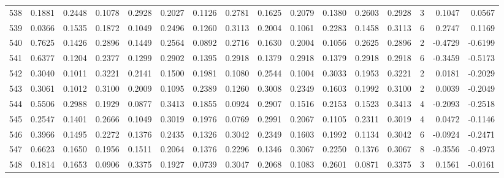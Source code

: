 \begin{tabular}{lrrrrrrrrrrrrrrr}
538 &      0.1881 &  0.2448 &  0.1078 &  0.2928 &  0.2027 &  0.1126 &  0.2781 &  0.1625 &  0.2079 &  0.1380 &   0.2603 &     0.2928 &      3 &                    0.1047 &                     0.0567 \\
539 &      0.0366 &  0.1535 &  0.1872 &  0.1049 &  0.2496 &  0.1260 &  0.3113 &  0.2004 &  0.1061 &  0.2283 &   0.1458 &     0.3113 &      6 &                    0.2747 &                     0.1169 \\
540 &      0.7625 &  0.1426 &  0.2896 &  0.1449 &  0.2564 &  0.0892 &  0.2716 &  0.1630 &  0.2004 &  0.1056 &   0.2625 &     0.2896 &      2 &                   -0.4729 &                    -0.6199 \\
541 &      0.6377 &  0.1204 &  0.2377 &  0.1299 &  0.2902 &  0.1395 &  0.2918 &  0.1379 &  0.2918 &  0.1379 &   0.2918 &     0.2918 &      6 &                   -0.3459 &                    -0.5173 \\
542 &      0.3040 &  0.1011 &  0.3221 &  0.2141 &  0.1500 &  0.1981 &  0.1080 &  0.2544 &  0.1004 &  0.3033 &   0.1953 &     0.3221 &      2 &                    0.0181 &                    -0.2029 \\
543 &      0.3061 &  0.1012 &  0.3100 &  0.2009 &  0.1095 &  0.2389 &  0.1260 &  0.3008 &  0.2349 &  0.1603 &   0.1992 &     0.3100 &      2 &                    0.0039 &                    -0.2049 \\
544 &      0.5506 &  0.2988 &  0.1929 &  0.0877 &  0.3413 &  0.1855 &  0.0924 &  0.2907 &  0.1516 &  0.2153 &   0.1523 &     0.3413 &      4 &                   -0.2093 &                    -0.2518 \\
545 &      0.2547 &  0.1401 &  0.2666 &  0.1049 &  0.3019 &  0.1976 &  0.0769 &  0.2991 &  0.2067 &  0.1105 &   0.2311 &     0.3019 &      4 &                    0.0472 &                    -0.1146 \\
546 &      0.3966 &  0.1495 &  0.2272 &  0.1376 &  0.2435 &  0.1326 &  0.3042 &  0.2349 &  0.1603 &  0.1992 &   0.1134 &     0.3042 &      6 &                   -0.0924 &                    -0.2471 \\
547 &      0.6623 &  0.1650 &  0.1956 &  0.1511 &  0.2064 &  0.1376 &  0.2296 &  0.1346 &  0.3067 &  0.2250 &   0.1376 &     0.3067 &      8 &                   -0.3556 &                    -0.4973 \\
548 &      0.1814 &  0.1653 &  0.0906 &  0.3375 &  0.1927 &  0.0739 &  0.3047 &  0.2068 &  0.1083 &  0.2601 &   0.0871 &     0.3375 &      3 &                    0.1561 &                    -0.0161 \\

\end{tabular}
